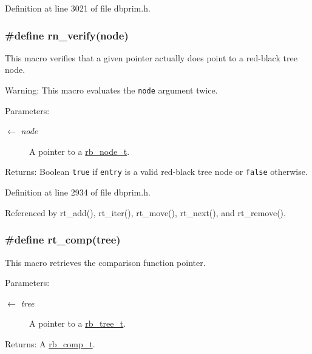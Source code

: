 Definition at line 3021 of file dbprim.h.\hypertarget{group__dbprim__rbtree_ga32}{
\subsubsection[rn\_\-verify]{\setlength{\rightskip}{0pt plus 5cm}\#define rn\_\-verify(node)}}
\label{group__dbprim__rbtree_ga32}


This macro verifies that a given pointer actually does point to a red-black tree node.

\begin{Desc}
\item[Warning:]This macro evaluates the {\tt node} argument twice.\end{Desc}
\begin{Desc}
\item[Parameters:]
\begin{description}
\item[\mbox{$\leftarrow$} {\em node}]A pointer to a \hyperlink{group__dbprim__rbtree_ga1}{rb\_\-node\_\-t}.\end{description}
\end{Desc}
\begin{Desc}
\item[Returns:]Boolean {\tt true} if {\tt entry} is a valid red-black tree node or {\tt false} otherwise.\end{Desc}


Definition at line 2934 of file dbprim.h.

Referenced by rt\_\-add(), rt\_\-iter(), rt\_\-move(), rt\_\-next(), and rt\_\-remove().\hypertarget{group__dbprim__rbtree_ga23}{
\subsubsection[rt\_\-comp]{\setlength{\rightskip}{0pt plus 5cm}\#define rt\_\-comp(tree)}}
\label{group__dbprim__rbtree_ga23}


This macro retrieves the comparison function pointer.

\begin{Desc}
\item[Parameters:]
\begin{description}
\item[\mbox{$\leftarrow$} {\em tree}]A pointer to a \hyperlink{group__dbprim__rbtree_ga0}{rb\_\-tree\_\-t}.\end{description}
\end{Desc}
\begin{Desc}
\item[Returns:]A \hyperlink{group__dbprim__rbtree_ga3}{rb\_\-comp\_\-t}.\end{Desc}


